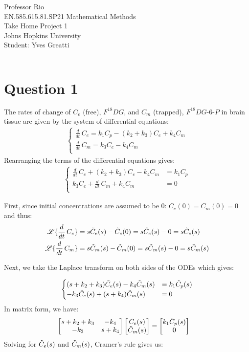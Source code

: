 \documentclass[12pt,twoside]{article}
\begin{document}
\noindent Professor Rio\\
EN.585.615.81.SP21 Mathematical Methods\\
Take Home Project 1\\
Johns Hopkins University\\
Student: Yves Greatti\\\

\section{Question 1}
The rates of change of $C_e$ (free), $F^{18}DG$,  and $C_m$ (trapped), $F^{18}DG$-$6$-$P$
in brain tissue  are given by the system of differential equations:
\begin{align*}
	\begin{cases}
		\frac{d}{dt} \, C_e  = k_1 C_p - (k_2 + k_3) C_e + k_4 C_m \\
		\frac{d}{dt} \, C_m = k_3 C_e -  k_4 C_m \\
	\end{cases}
\end{align*}
Rearranging the terms of the differential equations gives:
\begin{align*}
	\begin{cases}
		\frac{d}{dt} \, C_e  + (k_2 + k_3) C_e - k_4 C_m  &= k_1 C_p \\
		k_3 C_e + \frac{d}{dt} \, C_m + k_4 C_m  &= 0\\
	\end{cases}
\end{align*}

First, since initial concentrations are assumed to be $0$: $C_e(0) = C_m(0) = 0$ and thus:
\begin{align*}
\mathscr{L}\{ \frac{d}{dt} \, C_e  \} &= s \tilde{ C }_e(s) - \tilde{ C }_e(0) = s \tilde{ C }_e(s) - 0 = s \tilde{ C }_e(s) \\
\mathscr{L}\{ \frac{d}{dt} \, C_m  \} &= s \tilde{ C }_m(s) - \tilde{ C }_m(0) = s \tilde{ C }_m(s) - 0 = s \tilde{ C }_m(s) \\
\end{align*}

Next, we take the Laplace transform on both sides of the ODEs which gives:

\begin{align*}
	\begin{cases}
		(s + k_2 + k_3)  \tilde{ C }_e(s)  - k_4 \tilde{ C }_m(s) &= k_1 \tilde{ C }_p(s) \\
		-k_3  \tilde{ C }_e(s)  + (s + k_4) \tilde{ C }_m(s) &=  0
	\end{cases}
\end{align*}
 In matrix form, we have:
\begin{align*}
 \begin{bmatrix} s + k_2 + k_3 & -k_4 \\ -k_3 & s + k_4 \end{bmatrix} \begin{bmatrix}  \tilde{ C }_e(s) \\  \tilde{ C }_m(s) \end{bmatrix} &= \begin{bmatrix} k_1 \tilde{ C }_p(s)  \\ 0 \end{bmatrix}
\end{align*}
Solving for $\tilde{ C }_e(s)$ and $\tilde{ C }_m(s)$, Cramer's rule gives us:
\end{document}
